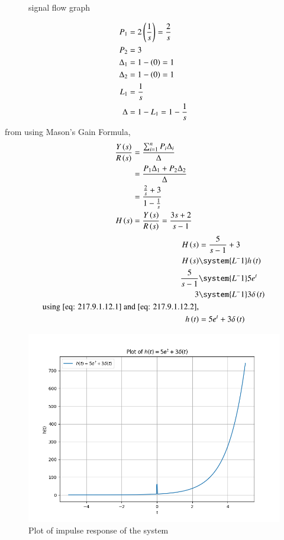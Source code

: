 \documentclass[journal,12pt,twocolumn]{IEEEtran}
\theoremstyle{remark}
\begin{document}
\begin{figure}[h]
    \centering
    
    \caption{signal flow graph}
    \label{fig: 217.9.1.12.2}
\end{figure}
\begin{align}
    P_1 & = 2\left(\frac{1}{s}\right) = \frac{2}{s}\\
    P_2 & = 3\\
    \Delta_1 & = 1 - \left(0\right) = 1\\
    \Delta_2 & = 1 - \left(0\right) = 1\\
    L_1 & = \frac{1}{s}\\
    \Delta & = 1 - L_1 = 1 - \frac{1}{s}
\end{align}
from  using Mason's Gain Formula,
\begin{align}
    \frac{Y\left(s\right)}{R\left(s\right)} & = \frac{{\sum_{i=1}^{n} P_i\Delta_i}}{{\Delta}}\\
    & = \frac{P_1\Delta_1 + P_2\Delta_2}{\Delta}\\
    & = \frac{\frac{2}{s} + 3}{1 - \frac{1}{s}}\\
    H\left(s\right) & = \frac{Y\left(s\right)}{R\left(s\right)} = \frac{3s+2}{s-1}
\end{align}
\begin{align}
    H\brak{s} & = \frac{5}{s-1} + 3\\
    H\brak{s} & \system{L^-1} h\brak{t}\\
    \frac{5}{s-1} & \system{L^-1} 5e^t\label{eq: 217.9.1.12.1}\\
    3 & \system{L^-1} 3\delta\brak{t}\label{eq: 217.9.1.12.2}\\
    \text{using \eqref{eq: 217.9.1.12.1} and \eqref{eq: 217.9.1.12.2},}\notag\\
    h\brak{t} & = 5e^t + 3\delta\brak{t}
\end{align}


\begin{figure}
    \centering
	\includegraphics[width=\linewidth]{figs/plot.png}
    \caption{Plot of impulse response of the system}
    \label{fig: 217.9.1.12.3}
\end{figure}
\end{document}
